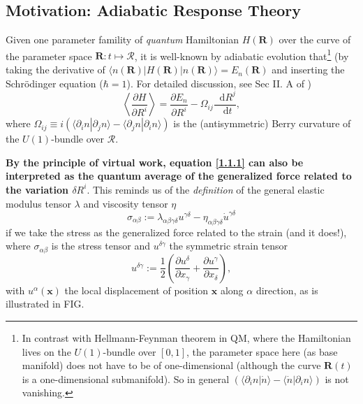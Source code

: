 \documentclass[10pt,nofootinbib,letterpaper]{revtex4}
\newcommand*\dd{\mathop{}\!\mathrm{d}}
\begin{document}
	\subsection{Motivation: Adiabatic Response Theory}
		Given one parameter famility of \emph{quantum} Hamiltonian $H(\bm{R})$ over the curve of the parameter space $\bm{R}:t\mapsto\mathcal{R}$, it is well-known by adiabatic evolution that\footnote{In contrast with Hellmann-Feynman theorem in QM, where the Hamiltonian lives on the $U(1)$-bundle over $[0,1]$, the parameter space here (as base manifold) does not have to be of one-dimensional (although the curve $\bm{R}(t)$ is a one-dimensional submanifold). So in general $(\langle\partial_i n|\dot{n}\rangle-\langle\dot{n}|\partial_i n\rangle)$ is not vanishing.} (by taking the derivative of $\langle n(\bm{R})|H(\bm{R})|n(\bm{R})\rangle=E_n(\bm{R})$ and inserting the Schr\"{o}dinger equation ($\hbar=1$). For detailed discussion, see Sec II. A of \cite{read2011hall})
		\begin{equation}\label{1.1.1}
			\left\langle \dfrac{\partial H}{\partial R^i}\right\rangle=\dfrac{\partial E_n}{\partial R^i}-\Omega_{ij}\dfrac{\dd R^j}{\dd t},
		\end{equation}
		where $\Omega_{ij}\equiv i(\langle\partial_i n|\partial_j n\rangle-\langle\partial_j n|\partial_i n\rangle)$ is the (antisymmetric) Berry curvature of the $U(1)$-bundle over $\mathcal{R}$.\par
		\textbf{By the principle of virtual work, equation \eqref{1.1.1} can also be interpreted as the quantum average of the generalized force related to the variation $\delta R^i$}. This reminds us of the \emph{definition} of the general elastic modulus tensor $\lambda$ and viscosity tensor $\eta$
		\begin{equation}\label{1.1.2}
			\sigma_{\alpha\beta}:=\lambda_{\alpha\beta\gamma\delta}u^{\gamma\delta}-\eta_{\alpha\beta\gamma\delta}\dot{u}^{\gamma\delta}
		\end{equation}
		if we take the stress as the generalized force related to the strain (and it does!), where $\sigma_{\alpha\beta}$ is the stress tensor and $u^{\delta\gamma}$ the symmetric strain tensor
		\begin{equation}\label{1.1.3}
			u^{\delta\gamma}:=\dfrac{1}{2}\left(\dfrac{\partial u^\delta}{\partial x_\gamma}+\dfrac{\partial u^\gamma}{\partial x_\delta}\right), 
		\end{equation}
		with $u^\alpha(\bm{x})$ the local displacement of position $\bm{x}$ along $\alpha$ direction, as is illustrated in FIG.\par
\end{document}
